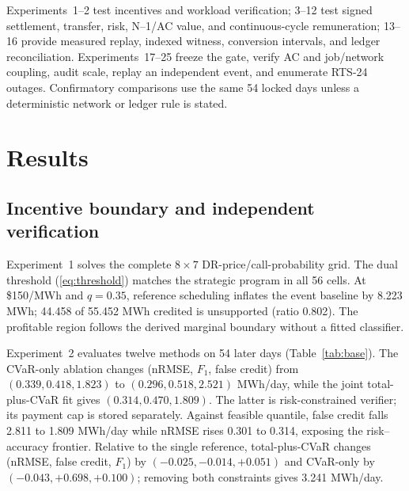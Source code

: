 \documentclass[10pt,journal]{IEEEtran}
\newcommand{\RiskSafe}{risk-constrained verifier}
\begin{document}
Experiments~1--2 test incentives and workload verification; 3--12 test signed
settlement, transfer, risk, N--1/AC value, and continuous-cycle remuneration;
13--16 provide measured replay, indexed witness, conversion intervals, and
ledger reconciliation. Experiments~17--25 freeze the gate, verify AC and
job/network coupling, audit scale, replay an independent event, and enumerate
RTS-24 outages. Confirmatory comparisons use the same 54 locked days unless a
deterministic network or ledger rule is stated.

\section{Results}\label{sec:results}

\subsection{Incentive boundary and independent verification}

Experiment~1 solves the complete $8\times7$ DR-price/call-probability grid.
The dual threshold (\ref{eq:threshold}) matches the strategic program in all 56
cells. At \$150/MWh and $q=0.35$, reference scheduling inflates the event
baseline by 8.223 MWh; 44.458 of 55.452 MWh credited is unsupported (ratio
0.802). The profitable region follows the derived marginal boundary without a
fitted classifier.

Experiment~2 evaluates twelve methods on 54 later days (Table~\ref{tab:base}).
The CVaR-only ablation changes (nRMSE, $F_1$, false credit) from
$(0.339,0.418,1.823)$ to $(0.296,0.518,2.521)$ MWh/day, while the joint
total-plus-CVaR fit gives $(0.314,0.470,1.809)$. The latter is \RiskSafe{};
its payment cap is stored separately. Against feasible quantile, false credit
falls 2.811 to 1.809 MWh/day while nRMSE rises 0.301 to 0.314, exposing the
risk--accuracy frontier. Relative to the single reference, total-plus-CVaR
changes (nRMSE, false credit, $F_1$) by $(-0.025,-0.014,+0.051)$ and CVaR-only
by $(-0.043,+0.698,+0.100)$; removing both constraints gives 3.241 MWh/day.
\end{document}
